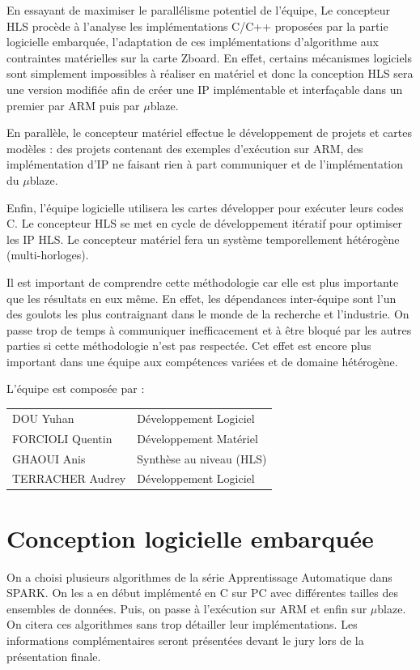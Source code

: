 \documentclass[12pt,a4paper]{article}
\begin{document}
En essayant de maximiser le parallélisme potentiel de l'équipe, Le concepteur HLS procède à l'analyse les implémentations C/C++ proposées par la partie logicielle embarquée, l'adaptation de ces implémentations d'algorithme aux contraintes matérielles sur la carte Zboard. En effet, certains mécanismes logiciels sont simplement impossibles à réaliser en matériel et donc la conception HLS sera une version modifiée afin de créer une IP implémentable et interfaçable dans un premier par ARM puis par $\mu$blaze.

En parallèle, le concepteur matériel effectue le développement de projets et cartes modèles : des projets contenant des exemples d'exécution sur ARM, des implémentation d'IP ne faisant rien à part communiquer et de l'implémentation du $\mu$blaze.

Enfin, l'équipe logicielle utilisera les cartes développer pour exécuter leurs codes C. Le concepteur HLS se met en cycle de développement itératif pour optimiser les IP HLS. Le concepteur matériel fera un système temporellement hétérogène (multi-horloges).

Il est important de comprendre cette méthodologie car elle est plus importante que les résultats en eux même. En effet, les dépendances inter-équipe sont l'un des goulots les plus contraignant dans le monde de la recherche et l'industrie. On passe trop de temps à communiquer inefficacement et à être bloqué par les autres parties si cette méthodologie n'est pas respectée. Cet effet est encore plus important dans une équipe aux compétences variées et de domaine hétérogène.

L'équipe est composée par :
\begin{tabular}{ll}
DOU Yuhan & Développement Logiciel\\
FORCIOLI Quentin & Développement Matériel\\
GHAOUI Anis & Synthèse au niveau (HLS)\\
TERRACHER Audrey & Développement Logiciel
\end{tabular}

\section{Conception logicielle embarquée}
On a choisi plusieurs algorithmes de la série Apprentissage Automatique dans SPARK. On les a en début implémenté en C sur PC avec différentes tailles des ensembles de données. Puis, on passe à l'exécution sur ARM et enfin sur $\mu$blaze. On citera ces algorithmes sans trop détailler leur implémentations. Les informations complémentaires seront présentées devant le jury lors de la présentation finale.
\end{document}
